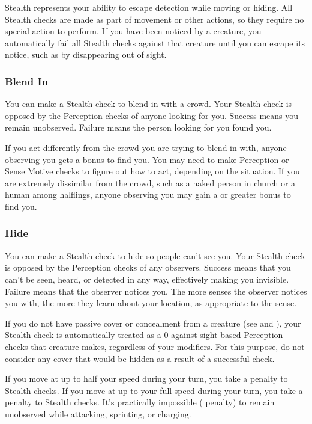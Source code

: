 Stealth represents your ability to escape detection while moving or hiding. All Stealth checks are made as part of movement or other actions, so they require no special action to perform. If you have been noticed by a creature, you automatically fail all Stealth checks against that creature until you can escape its notice, such as by disappearing out of sight.

\subsubsection{Blend In}
You can make a Stealth check to blend in with a crowd. Your Stealth check is opposed by the Perception checks of anyone looking for you. Success means you remain unobserved. Failure means the person looking for you found you.

If you act differently from the crowd you are trying to blend in with, anyone observing you gets a  bonus to find you. You may need to make Perception or Sense Motive checks to figure out how to act, depending on the situation. If you are extremely dissimilar from the crowd, such as a naked person in church or a human among halflings, anyone observing you may gain a  or greater bonus to find you. 

\subsubsection{Hide}
You can make a Stealth check to hide so people can't see you. Your Stealth check is opposed by the Perception checks of any observers. Success means that you can't be seen, heard, or detected in any way, effectively making you invisible. Failure means that the observer notices you. The more senses the observer notices you with, the more they learn about your location, as appropriate to the sense. 

If you do not have passive cover or concealment from a creature (see  and ), your Stealth check is automatically treated as a 0 against sight-based Perception checks that creature makes, regardless of your modifiers. For this purpose, do not consider any cover that would be hidden as a result of a successful check.

If you move at up to half your speed during your turn, you take a  penalty to Stealth checks. If you move at up to your full speed during your turn, you take a  penalty to Stealth checks. It's practically impossible ( penalty) to remain unobserved while attacking, sprinting, or charging.

